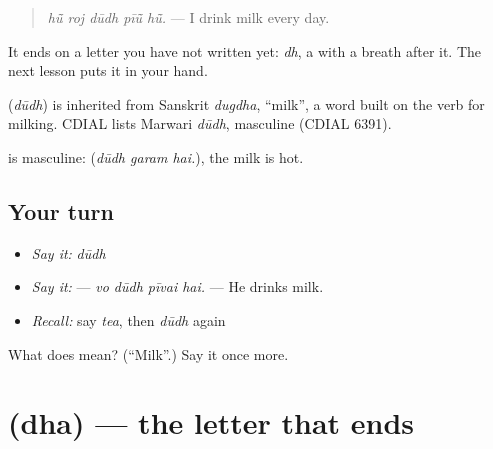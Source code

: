 \begin{quote}
\textbf{    }
\end{quote}

\begin{quote}
\emph{hū̃ roj dūdh pīū̃ hū̃.} — I drink milk every day.
\end{quote}

It ends on a letter you have not written yet: \emph{dh}, a \textbf{} with a breath after it. The next lesson puts it in your hand.

\begin{cousinweb}
\textbf{} (\emph{dūdh}) is inherited from Sanskrit \emph{dugdha}, \textquotedblleft{}milk\textquotedblright{}, a word built on the verb for milking. CDIAL lists Marwari \emph{dūdh}, masculine (CDIAL 6391).
\end{cousinweb}

\begin{grammarlens}[title={What you've built}]
\textbf{} is masculine: \textbf{  } (\emph{dūdh garam hai.}), the milk is hot.
\end{grammarlens}

\subsection*{Your turn}
\begin{itemize}
\raggedright
  \item \emph{Say it:} \emph{dūdh}
  \item \emph{Say it:} \textbf{   } — \emph{vo dūdh pīvai hai.} — He drinks milk.
  \item \emph{Recall:} say \emph{tea}, then \emph{dūdh} again
\end{itemize}

\begin{tcolorbox}[breakable,colback=teal!4,colframe=teal!35!black,title={Before you move on}]
What does \textbf{} mean? (\textquotedblleft{}Milk\textquotedblright{}.) Say it once more.
\end{tcolorbox}
\section[\texorpdfstring{\mw{ध} (dha)}{ध (dha)}]{ (dha) — the letter that ends }

\label{lesson:MW-W46-dha}



